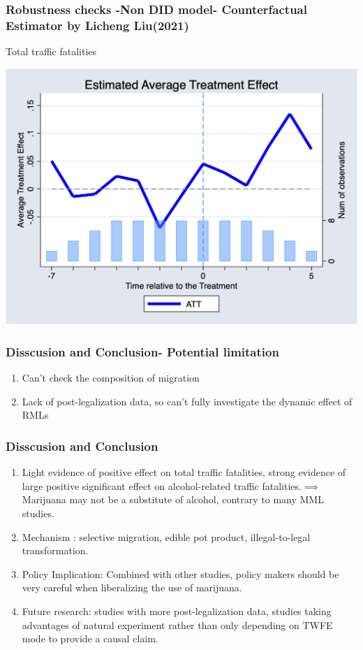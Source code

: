 \documentclass{beamer}
\begin{document}
\begin{frame} %
\frametitle{Robustness checks -Non DID model- Counterfactual Estimator  by Licheng Liu(2021)}
	Total traffic fatalities

	\includegraphics[scale = 0.38]{counter_estimator1} 	
\end{frame}

\begin{frame}
\frametitle{Disscusion and Conclusion- Potential limitation}
	\begin{enumerate}
		\item Can't check the composition of migration
		\item Lack of post-legalization data, so can't fully investigate the dynamic effect of RMLs
		
	
	\end{enumerate}


\end{frame}



\begin{frame}
\frametitle{Disscusion and Conclusion}
\begin{enumerate}
		\item
	Light evidence of positive effect  on total traffic fatalities, strong evidence of  large positive significant effect on alcohol-related traffic fatalities.$\implies$ Marijuana may not be a substitute of alcohol, contrary to many MML studies.  \pause
		\item
	Mechanism : selective migration, edible pot product, illegal-to-legal transformation. \pause
		\item
	Policy Implication: Combined with other studies, policy makers should be very careful when liberalizing the use of marijuana. \pause
		\item
	Future research: studies with more post-legalization data, studies taking advantages of natural experiment rather than only depending on TWFE mode to provide a causal claim. 
	\end{enumerate}
	
\end{frame}
\end{document}
